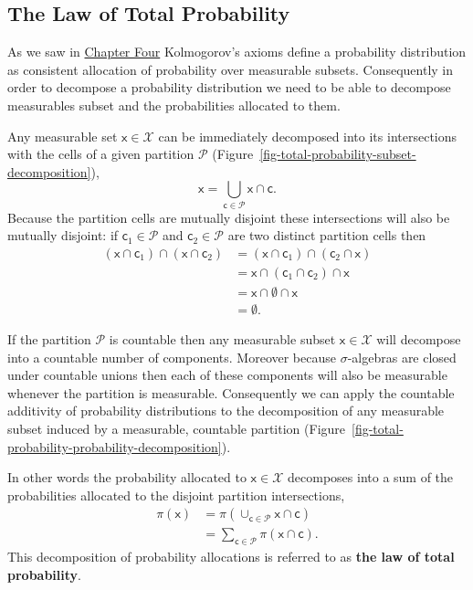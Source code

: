 \documentclass[
  letterpaper,
  DIV=11,
  numbers=noendperiod]{scrartcl}
\begin{document}
\subsection{The Law of Total
Probability}\label{the-law-of-total-probability}

As we saw in
\href{https://betanalpha.github.io/assets/chapters_html/probability_on_general_spaces.html}{Chapter
Four} Kolmogorov's axioms define a probability distribution as
consistent allocation of probability over measurable subsets.
Consequently in order to decompose a probability distribution we need to
be able to decompose measurables subset and the probabilities allocated
to them.

Any measurable set \(\mathsf{x} \in \mathcal{X}\) can be immediately
decomposed into its intersections with the cells of a given partition
\(\mathcal{P}\)
(Figure~\ref{fig-total-probability-subset-decomposition}), \[
\mathsf{x}
=
\bigcup_{\mathsf{c} \in \mathcal{P}} \mathsf{x} \cap \mathsf{c}.
\] Because the partition cells are mutually disjoint these intersections
will also be mutually disjoint: if \(\mathsf{c}_{1} \in \mathcal{P}\)
and \(\mathsf{c}_{2} \in \mathcal{P}\) are two distinct partition cells
then \begin{align*}
( \mathsf{x} \cap \mathsf{c}_{1} ) \cap ( \mathsf{x} \cap \mathsf{c}_{2} )
&=
( \mathsf{x} \cap \mathsf{c}_{1} ) \cap ( \mathsf{c}_{2} \cap \mathsf{x}  )
\\
&=
\mathsf{x} \cap ( \mathsf{c}_{1} \cap \mathsf{c}_{2} ) \cap \mathsf{x}
\\
&=
\mathsf{x} \cap \emptyset \cap \mathsf{x}
\\
&= \emptyset.
\end{align*}

If the partition \(\mathcal{P}\) is countable then any measurable subset
\(\mathsf{x} \in \mathcal{X}\) will decompose into a countable number of
components. Moreover because \(\sigma\)-algebras are closed under
countable unions then each of these components will also be measurable
whenever the partition is measurable. Consequently we can apply the
countable additivity of probability distributions to the decomposition
of any measurable subset induced by a measurable, countable partition
(Figure~\ref{fig-total-probability-probability-decomposition}).

In other words the probability allocated to
\(\mathsf{x} \in \mathcal{X}\) decomposes into a sum of the
probabilities allocated to the disjoint partition intersections,
\begin{align*}
\pi(\mathsf{x})
&=
\pi( \cup_{\mathsf{c} \in \mathcal{P}} \mathsf{x} \cap \mathsf{c} )
\\
&=
\sum_{\mathsf{c} \in \mathcal{P}} \pi( \mathsf{x} \cap \mathsf{c} ).
\end{align*} This decomposition of probability allocations is referred
to as \textbf{the law of total probability}.
\end{document}

